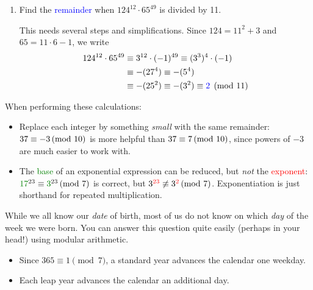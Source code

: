\begin{examples}{}{}
\begin{enumerate}
	  \item Find the \textcolor{blue}{remainder} when $124^{12}\cdot 65^{49}$ is divided by 11.\par
	  This needs several steps and simplifications. Since $124=11^2+3$ and $65=11\cdot 6-1$, we write
	  \begin{align*}
	  	124^{12}\cdot 65^{49}&\equiv 3^{12}\cdot(-1)^{49}\equiv (3^3)^4\cdot (-1)\\
	  	&\equiv -(27^4)\equiv -(5^4)\\
	  	&\equiv -(25^2)\equiv -(3^2)\equiv \textcolor{blue}{2}\pmod{11}
	  \end{align*}
	\end{enumerate}
\end{examples}


When performing these calculations:
\begin{itemize}
  \item Replace each integer by something \emph{small} with the same remainder: $37\equiv -3\negthickspace\pmod{10}$ is more helpful than $37\equiv 7\negthickspace\pmod{10}$, since powers of $-3$ are much easier to work with.
  \item The \textcolor{Green}{base} of an exponential expression can be reduced, but \emph{not} the \textcolor{red}{exponent}: $\textcolor{Green}{17}^{23}\equiv \textcolor{Green}{3}^{23}\spmod 7$ is correct, but $3^{\textcolor{red}{23}}\not\equiv 3^{\textcolor{red}{2}}\negthickspace\pmod{7}$. Exponentiation is just shorthand for repeated multiplication.
\end{itemize}



While we all know our \emph{date} of birth, most of us do not know on which \emph{day} of the week we were born. You can answer this question quite easily (perhaps in your head!) using modular arithmetic.
\begin{itemize}
  \item Since $365\equiv 1\pmod 7$, a standard year advances the calendar one weekday.
  \item Each leap year\footnotemark{} advances the calendar an additional day.
\end{itemize}

